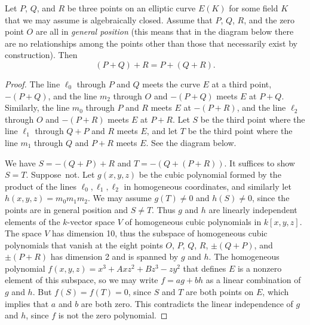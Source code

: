 \begin{thm*}
Let $P$, $Q$, and $R$ be three points on an elliptic curve $E(K)$ for some field $K$ that we may assume is algebraically closed.
Assume that $P$, $Q$, $R$, and the zero point $O$ are all in \emph{general position} (this means that in the diagram below there are no relationships among the points other than those that necessarily exist by construction). Then
\[
(P+Q)+R=P+(Q+R).
\]
\end{thm*}
\begin{proof}
The line $\ell_0$ through $P$ and $Q$ meets the curve $E$ at a third point, $-(P+Q)$, and the line $m_2$ through $O$ and $-(P+Q)$ meets $E$ at $P+Q$.
Similarly, the line $m_0$ through $P$ and $R$ meets $E$ at $-(P+R)$, and the line $\ell_2$ through $O$ and $-(P+R)$ meets $E$ at $P+R$.
Let $S$ be the third point where the line $\ell_1$ through $Q+P$ and $R$ meets $E$, and let $T$ be the third point where the line $m_1$ through $Q$ and $P+R$ meets $E$.  See the diagram below.

\begin{center}
\end{center}

We have $S=-(Q+P)+R$ and $T=-(Q+(P+R))$.  It suffices to show $S=T$.
Suppose~not.
Let $g(x,y,z)$ be the cubic polynomial formed by the product of the lines $\ell_0,\ell_1,\ell_2$ in homogeneous coordinates,
and similarly let $h(x,y,z)=m_0m_1m_2$.
We may assume $g(T)\ne 0$ and $h(S)\ne 0$, since the points are in general position and $S\ne T$.
Thus $g$ and $h$ are linearly independent elements of the $k$-vector space $V$ of homogeneous cubic polynomials in $k[x,y,z]$.
The space $V$ has dimension 10, thus the subspace of homogeneous cubic polynomials that vanish at the eight points $O$, $P$, $Q$, $R$,
$\pm(Q+P)$, and $\pm(P+R)$ has dimension 2 and is spanned by $g$ and $h$.
The homogeneous polynomial $f(x,y,z)=x^3+Axz^2+Bz^3-zy^2$ that defines $E$ is a nonzero element of this subspace, so we may write $f=ag+bh$ as a linear combination of $g$ and $h$.
But $f(S)=f(T)=0$, since $S$ and $T$ are both points on $E$, which implies that $a$ and $b$ are both zero.
This contradicts the linear independence of $g$ and $h$, since $f$ is not the zero polynomial.
\end{proof}
